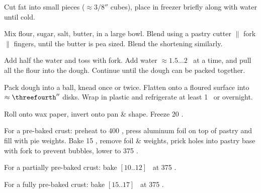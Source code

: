 \begin{preparation}
\item Cut fat into small pieces ($\approx 3/8''$ cubes), place in freezer
    briefly along with water until cold.

\item Mix flour, sugar, salt, butter, in a large bowl.
    Blend using a pastry cutter $\|$ fork $\|$ fingers, until the butter is pea sized.
    Blend the shortening similarly.

\item Add half the water and toss with fork.
    Add water $\approx 1.5 \dots 2$ \Tablespoon~at a time, and pull all the
    flour into the dough.
    Continue until the dough can be packed together.

\item Pack dough into a ball, knead once or twice.
    Flatten onto a floured surface into $\approx \threefourth''$ disks.
    Wrap in plastic and refrigerate at least 1 \hour~or overnight.

\item Roll onto wax paper, invert onto pan \& shape.
    Freeze 20 \minute.

\item For a pre-baked crust: preheat to 400 \Fahrenheit, press aluminum foil
    on top of pastry and fill with pie weights.
    Bake 15 \minute, remove foil \& weights, prick holes into pastry base
    with fork to prevent bubbles, lower to 375 \Fahrenheit.

\item For a partially pre-baked crust: bake $[10..12]$ \minute~at 375 \Fahrenheit.

\item For a fully pre-baked crust: bake $[15..17]$ \minute~at 375 \Fahrenheit.
\end{preparation}

\recipeend%
